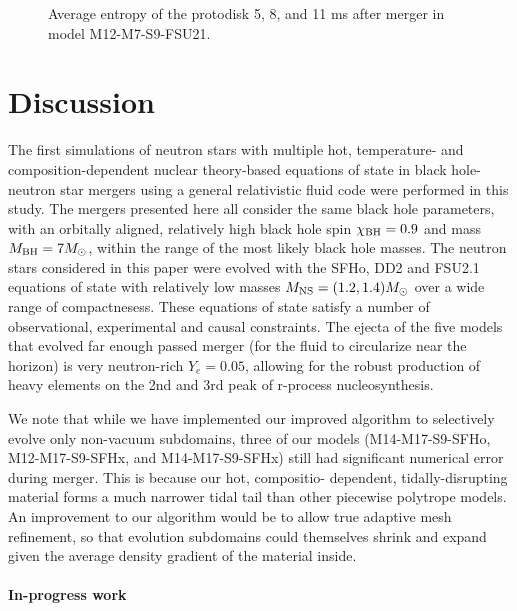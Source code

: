 \begin{figure}
	\centering
	
	\caption[Average entropy of the protodisks 5, 8, and 11 ms after merger]{
		Average entropy of the protodisk 5, 8, and 11 ms after merger in model M12-M7-S9-FSU21.
	}
	\label{fig:longdiskentropies}
\end{figure}

\section{Discussion}
\label{sec:discussion}

The first simulations of neutron stars with multiple hot, temperature- and composition-dependent nuclear theory-based equations of state in black hole-neutron star mergers using a general relativistic fluid code were performed in this study.  
The mergers presented here all consider the same black hole parameters, with an orbitally aligned, relatively high black hole spin $\chi_{\rm BH} = 0.9$ and  mass $M_{\rm BH} = 7 M_\odot$, within the range of the most likely black hole masses.  
The neutron stars considered in this paper were evolved with the SFHo, DD2 and FSU2.1 equations of state with relatively low masses $M_{\rm NS} = (1.2,1.4) M_\odot$ over a wide range of compactnesess.  
These equations of state satisfy a number of observational, experimental and causal constraints.  
The ejecta of the five models that evolved far enough passed merger (for the fluid to circularize near the horizon) is very neutron-rich $Y_e = 0.05$, allowing for the robust production of heavy elements on the 2nd and 3rd peak of r-process nucleosynthesis.

We note that while we have implemented our improved algorithm to selectively evolve only non-vacuum subdomains, three of our models (M14-M17-S9-SFHo, M12-M17-S9-SFHx, and M14-M17-S9-SFHx) still had significant numerical error during merger. 
This is because our hot, compositio- dependent, tidally-disrupting material forms a much narrower tidal tail than other piecewise polytrope models.
An improvement to our algorithm would be to allow true adaptive mesh refinement, so that evolution subdomains could themselves shrink and expand given the average density gradient of the material inside.

\paragraph{In-progress work}

